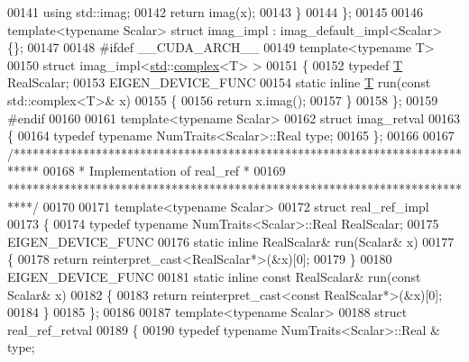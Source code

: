 \begin{DoxyCode}
00141     \textcolor{keyword}{using} std::imag;
00142     \textcolor{keywordflow}{return} imag(x);
00143   \}
00144 \};
00145 
00146 \textcolor{keyword}{template}<\textcolor{keyword}{typename} Scalar> \textcolor{keyword}{struct }imag\_impl : imag\_default\_impl<Scalar> \{\};
00147 
00148 \textcolor{preprocessor}{#ifdef \_\_CUDA\_ARCH\_\_}
00149 \textcolor{keyword}{template}<\textcolor{keyword}{typename} T>
00150 \textcolor{keyword}{struct }imag\_impl<\hyperlink{namespacestd}{std}::\hyperlink{structcomplex}{complex}<T> >
00151 \{
00152   \textcolor{keyword}{typedef} \hyperlink{group___sparse_core___module_class_eigen_1_1_triplet}{T} RealScalar;
00153   EIGEN\_DEVICE\_FUNC
00154   \textcolor{keyword}{static} \textcolor{keyword}{inline} \hyperlink{group___sparse_core___module_class_eigen_1_1_triplet}{T} run(\textcolor{keyword}{const} std::complex<T>& x)
00155   \{
00156     \textcolor{keywordflow}{return} x.imag();
00157   \}
00158 \};
00159 \textcolor{preprocessor}{#endif}
00160 
00161 \textcolor{keyword}{template}<\textcolor{keyword}{typename} Scalar>
00162 \textcolor{keyword}{struct }imag\_retval
00163 \{
00164   \textcolor{keyword}{typedef} \textcolor{keyword}{typename} NumTraits<Scalar>::Real type;
00165 \};
00166 
00167 \textcolor{comment}{/****************************************************************************}
00168 \textcolor{comment}{* Implementation of real\_ref                                             *}
00169 \textcolor{comment}{****************************************************************************/}
00170 
00171 \textcolor{keyword}{template}<\textcolor{keyword}{typename} Scalar>
00172 \textcolor{keyword}{struct }real\_ref\_impl
00173 \{
00174   \textcolor{keyword}{typedef} \textcolor{keyword}{typename} NumTraits<Scalar>::Real RealScalar;
00175   EIGEN\_DEVICE\_FUNC
00176   \textcolor{keyword}{static} \textcolor{keyword}{inline} RealScalar& run(Scalar& x)
00177   \{
00178     \textcolor{keywordflow}{return} \textcolor{keyword}{reinterpret\_cast<}RealScalar*\textcolor{keyword}{>}(&x)[0];
00179   \}
00180   EIGEN\_DEVICE\_FUNC
00181   \textcolor{keyword}{static} \textcolor{keyword}{inline} \textcolor{keyword}{const} RealScalar& run(\textcolor{keyword}{const} Scalar& x)
00182   \{
00183     \textcolor{keywordflow}{return} \textcolor{keyword}{reinterpret\_cast<}\textcolor{keyword}{const }RealScalar*\textcolor{keyword}{>}(&x)[0];
00184   \}
00185 \};
00186 
00187 \textcolor{keyword}{template}<\textcolor{keyword}{typename} Scalar>
00188 \textcolor{keyword}{struct }real\_ref\_retval
00189 \{
00190   \textcolor{keyword}{typedef} \textcolor{keyword}{typename} NumTraits<Scalar>::Real & type;

\end{DoxyCode}
